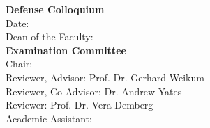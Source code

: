 
%
%
%

\newpage
\noindent
\textbf{Defense Colloquium} \\[0.25cm]
Date: \hspace{3.2cm}\\[1cm]
Dean of the Faculty: \hspace{0.88cm} \\[2.5cm]
%
\textbf{Examination Committee} \\[0.25cm]
Chair: \hspace{3.1cm}\\[1.0cm]%
%
Reviewer, Advisor: \hspace{1.05cm} Prof. Dr. Gerhard Weikum\\[1.0cm]
%
Reviewer, Co-Advisor: \hspace{0.55cm} Dr. Andrew Yates\\[1.0cm]
%
Reviewer: \hspace{2.50cm} Prof. Dr. Vera Demberg\\[1.0cm]
%
Academic Assistant: \hspace{0.92cm}\\[1.0cm]%

\cleardoublepage



\cleardoublepage



